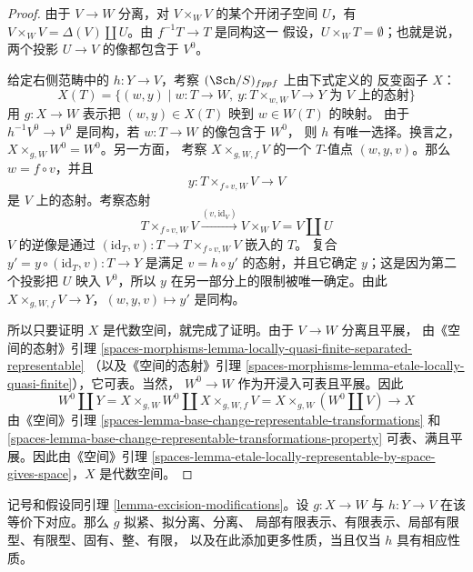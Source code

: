 \begin{proof}
由于 $V \to W$ 分离，对 $V \times_W V$ 的某个开闭子空间 $U$，有
$V \times_W V = \Delta(V) \amalg U$。由 $f^{-1}T \to T$ 是同构这一
假设，$U \times_W T = \emptyset$；也就是说，%
两个投影 $U \to V$ 的像都包含于 $V^0$。

\medskip\noindent
给定右侧范畴中的 $h : Y \to V$，考察 $(\Sch/S)_{fppf}$ 上由下式定义的
反变函子 $X$：
$$
X(T) = \{(w, y) \mid
w :  T \to W,\ y : T \times_{w, W} V \to Y\text{ 为 }V\text{ 上的态射}\}
$$
用 $g : X \to W$ 表示把 $(w, y) \in X(T)$ 映到 $w \in W(T)$ 的映射。
由于 $h^{-1}V^0 \to V^0$ 是同构，若 $w : T \to W$ 的像包含于 $W^0$，
则 $h$ 有唯一选择。换言之，$X \times_{g, W} W^0 = W^0$。另一方面，
考察 $X \times_{g, W, f} V$ 的一个 $T$-值点 $(w, y, v)$。那么
$w = f \circ v$，并且
$$
y : T \times_{f \circ v, W} V \longrightarrow V
$$
是 $V$ 上的态射。考察态射
$$
T \times_{f \circ v, W} V \xrightarrow{(v, \text{id}_V)}
V \times_W V = V \amalg U
$$
$V$ 的逆像是通过
$(\text{id}_T, v) : T \to T \times_{f \circ v, W} V$ 嵌入的 $T$。
复合 $y' = y \circ (\text{id}_T, v) : T \to Y$ 是满足
$v = h \circ y'$ 的态射，并且它确定 $y$；这是因为第二个投影把 $U$
映入 $V^0$，所以 $y$ 在另一部分上的限制被唯一确定。由此
$X \times_{g, W, f} V \to Y$，$(w, y, v) \mapsto y'$ 是同构。

\medskip\noindent
所以只要证明 $X$ 是代数空间，就完成了证明。由于 $V \to W$ 分离且平展，
由《空间的态射》引理
\ref{spaces-morphisms-lemma-locally-quasi-finite-separated-representable}
（以及《空间的态射》引理
\ref{spaces-morphisms-lemma-etale-locally-quasi-finite}），它可表。当然，
$W^0 \to W$ 作为开浸入可表且平展。因此
$$
W^0 \amalg Y = X \times_{g, W} W^0 \amalg X \times_{g, W, f} V
= X \times_{g, W} (W^0 \amalg V) \longrightarrow X
$$
由《空间》引理 \ref{spaces-lemma-base-change-representable-transformations}
和 \ref{spaces-lemma-base-change-representable-transformations-property}
可表、满且平展。因此由《空间》引理
\ref{spaces-lemma-etale-locally-representable-by-space-gives-space}，$X$
是代数空间。
\end{proof}

\begin{lemma}
\label{lemma-excision-modifications-properties}
记号和假设同引理 \ref{lemma-excision-modifications}。设 $g : X \to W$
与 $h : Y \to V$ 在该等价下对应。那么 $g$ 拟紧、拟分离、分离、
局部有限表示、有限表示、局部有限型、有限型、固有、整、有限，
以及在此添加更多性质，当且仅当 $h$ 具有相应性质。
\end{lemma}

